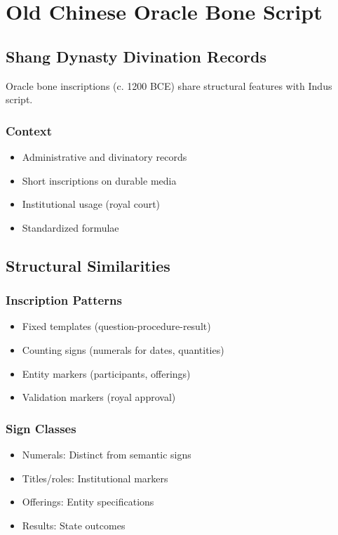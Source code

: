 \section{Old Chinese Oracle Bone Script}

\subsection{Shang Dynasty Divination Records}

Oracle bone inscriptions (c. 1200 BCE) share structural features with Indus script.

\subsubsection{Context}
\begin{itemize}
    \item Administrative and divinatory records
    \item Short inscriptions on durable media
    \item Institutional usage (royal court)
    \item Standardized formulae
\end{itemize}

\subsection{Structural Similarities}

\subsubsection{Inscription Patterns}
\begin{itemize}
    \item Fixed templates (question-procedure-result)
    \item Counting signs (numerals for dates, quantities)
    \item Entity markers (participants, offerings)
    \item Validation markers (royal approval)
\end{itemize}

\subsubsection{Sign Classes}
\begin{itemize}
    \item Numerals: Distinct from semantic signs
    \item Titles/roles: Institutional markers
    \item Offerings: Entity specifications
    \item Results: State outcomes
\end{itemize}

